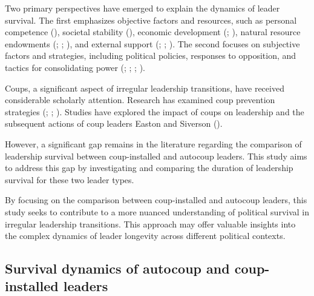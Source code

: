 \documentclass[
  12pt,
]{article}
\begin{document}
Two primary perspectives have emerged to explain the dynamics of leader
survival. The first emphasizes objective factors and resources, such as
personal competence (),
societal stability (), economic
development (;
), natural resource endowments
(;
;
), and
external support (;
; ). The second focuses on subjective factors and strategies,
including political policies, responses to opposition, and tactics for
consolidating power (; ;
;
).

Coups, a significant aspect of irregular leadership transitions, have
received considerable scholarly attention. Research has examined coup
prevention strategies (;
; ). Studies have explored the impact of coups on leadership
and the subsequent actions of coup leaders Easton and Siverson
().

However, a significant gap remains in the literature regarding the
comparison of leadership survival between coup-installed and autocoup
leaders. This study aims to address this gap by investigating and
comparing the duration of leadership survival for these two leader
types.

By focusing on the comparison between coup-installed and autocoup
leaders, this study seeks to contribute to a more nuanced understanding
of political survival in irregular leadership transitions. This approach
may offer valuable insights into the complex dynamics of leader
longevity across different political contexts.

\subsection{Survival dynamics of autocoup and coup-installed
leaders}\label{survival-dynamics-of-autocoup-and-coup-installed-leaders}
\end{document}
